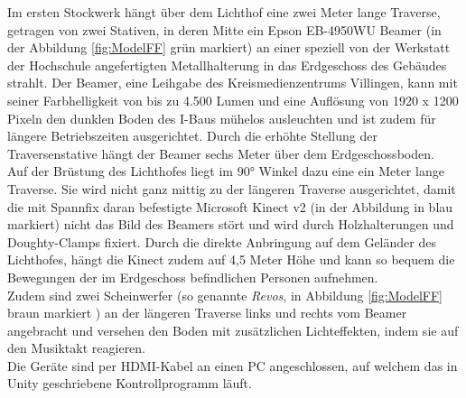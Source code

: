 Im ersten Stockwerk hängt über dem Lichthof eine zwei Meter lange Traverse, getragen von zwei Stativen, in deren Mitte ein Epson EB-4950WU Beamer (in der Abbildung \autoref{fig:ModelFF} grün markiert) an einer speziell von der Werkstatt der Hochschule angefertigten Metallhalterung in das Erdgeschoss des Gebäudes strahlt. Der Beamer, eine Leihgabe des Kreismedienzentrums Villingen, kann mit seiner Farbhelligkeit von bis zu 4.500 Lumen und eine Auflösung von 1920 x 1200 Pixeln den dunklen Boden des I-Baus mühelos ausleuchten und ist zudem für längere Betriebszeiten ausgerichtet. Durch die erhöhte Stellung der Traversenstative hängt der Beamer sechs Meter über dem Erdgeschossboden.\\
Auf der Brüstung des Lichthofes liegt im 90° Winkel dazu eine ein Meter lange Traverse. Sie wird nicht ganz mittig zu der längeren Traverse ausgerichtet, damit die mit Spannfix daran befestigte Microsoft Kinect v2 (in der Abbildung in blau markiert) nicht das Bild des Beamers stört und wird durch Holzhalterungen und Doughty-Clamps fixiert. Durch die direkte Anbringung auf dem Geländer des Lichthofes, hängt die Kinect zudem auf 4,5 Meter Höhe und kann so bequem die Bewegungen der im Erdgeschoss befindlichen Personen aufnehmen.\\
Zudem sind zwei Scheinwerfer (so genannte \textit{Revos}, in Abbildung \autoref{fig:ModelFF} braun markiert ) an der längeren Traverse links und rechts vom Beamer angebracht und versehen den Boden mit zusätzlichen Lichteffekten, indem sie auf den Musiktakt reagieren.\\
Die Geräte sind per HDMI-Kabel an einen PC angeschlossen, auf welchem das in Unity geschriebene Kontrollprogramm läuft. 


